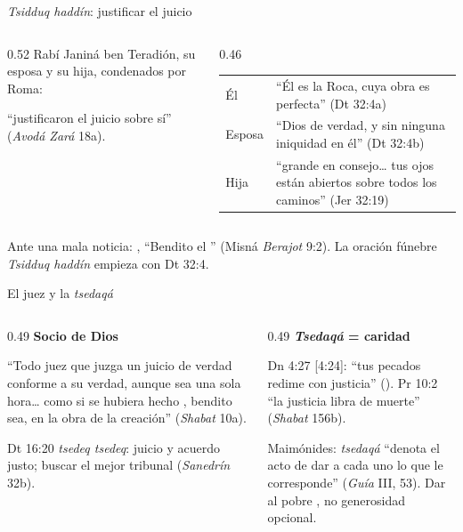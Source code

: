 \begin{frame}{\emph{Tsidduq haddín}: justificar el juicio}
\begin{columns}[c,onlytextwidth]
\begin{column}{0.52\textwidth}\small
Rabí Janiná ben Teradión, su esposa y su hija, condenados por Roma:
\begin{center}\end{center}
``justificaron el juicio sobre sí'' (\emph{Avodá Zará} 18a).
\end{column}
\begin{column}{0.46\textwidth}
\scriptsize\renewcommand{\arraystretch}{1.15}
\begin{tabular}{@{}>{\RaggedRight\arraybackslash}p{1.2cm}>{\RaggedRight\arraybackslash}p{3.8cm}@{}}
\toprule
Él & ``Él es la Roca, cuya obra es perfecta'' (Dt 32:4a) \\
Esposa & ``Dios de verdad, y sin ninguna iniquidad en él'' (Dt 32:4b) \\
Hija & ``grande en consejo\ldots{} tus ojos están abiertos sobre todos los caminos'' (Jer 32:19) \\
\bottomrule
\end{tabular}
\end{column}
\end{columns}\par\medskip
\small Ante una mala noticia: , ``Bendito el '' (Misná \emph{Berajot} 9:2). La oración fúnebre \emph{Tsidduq haddín} empieza con Dt 32:4.\par
{}
\end{frame}

\begin{frame}{El juez y la \emph{tsedaqá}}
\begin{columns}[t,onlytextwidth]
\begin{column}{0.49\textwidth}\small
\textbf{\color{azul}Socio de Dios}\par
``Todo juez que juzga un juicio de verdad conforme a su verdad, aunque sea una sola hora\ldots{} como si se hubiera hecho , bendito sea, en la obra de la creación'' (\emph{Shabat} 10a).\par\smallskip
Dt 16:20 \emph{tsedeq tsedeq}: juicio y acuerdo justo; buscar el mejor tribunal (\emph{Sanedrín} 32b).
\end{column}
\begin{column}{0.49\textwidth}\small
\textbf{\color{azul}\emph{Tsedaqá} = caridad}\par
Dn 4:27 [4:24]: ``tus pecados redime con justicia'' (). Pr 10:2 ``la justicia libra de muerte'' (\emph{Shabat} 156b).\par\smallskip
Maimónides: \emph{tsedaqá} ``denota el acto de dar a cada uno lo que le corresponde'' (\emph{Guía} III, 53). Dar al pobre , no generosidad opcional.
\end{column}
\end{columns}
\end{frame}

